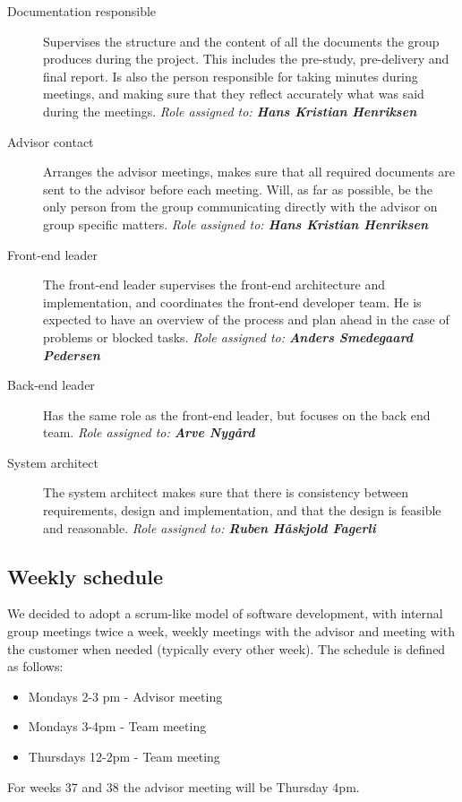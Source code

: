 \documentclass[11pt,a4paper,titlepage,oneside]{report}
\begin{document}
\begin{description}
\item[Documentation responsible] Supervises the structure and the content of all the documents the group produces during the project. This includes the pre-study, pre-delivery and final report. Is also the person responsible for taking minutes during meetings, and making sure that they reflect accurately what was said during the meetings.
\emph{Role assigned to: \textbf{Hans Kristian Henriksen}}

\item[Advisor contact] Arranges the advisor meetings, makes sure that all required documents are sent to the advisor before each meeting. Will, as far as possible, be the only person from the group communicating directly with the advisor on group specific matters.
\emph{Role assigned to: \textbf{Hans Kristian Henriksen}}

\item[Front-end leader] The front-end leader supervises the front-end architecture and implementation, and coordinates the front-end developer team. He is expected to have an overview of the process and plan ahead in the case of problems or blocked tasks.
\emph{Role assigned to: \textbf{Anders Smedegaard Pedersen}}

\item[Back-end leader] Has the same role as the front-end leader, but focuses on the back end team.
\emph{Role assigned to: \textbf{Arve Nygård}}

\item[System architect] The system architect makes sure that there is consistency between requirements, design and implementation, and that the design is feasible and reasonable.
\emph{Role assigned to: \textbf{Ruben Håskjold Fagerli}}
\end{description}

\subsection{Weekly schedule}
We decided to adopt a scrum-like model of software development, with internal group meetings twice a week, weekly meetings with the advisor and meeting with the customer when needed (typically every other week). The schedule is defined as follows:
\begin{itemize}
\item Mondays 2-3 pm - Advisor meeting
\item Mondays 3-4pm - Team meeting
\item Thursdays 12-2pm - Team meeting
\end{itemize}
For weeks 37 and 38 the advisor meeting will be Thursday 4pm.
\end{document}
